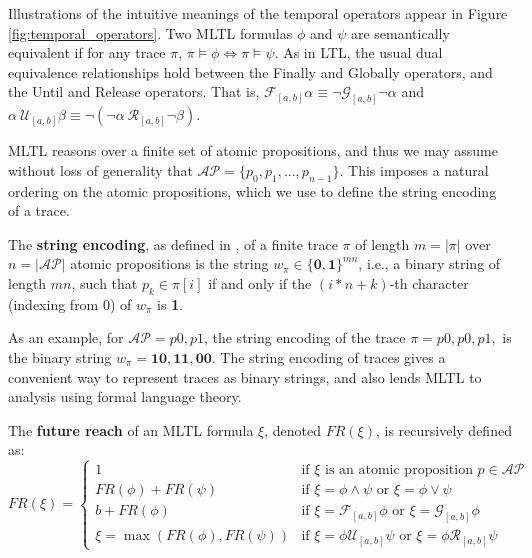\documentclass[letterpaper]{article} %
\begin{document}
Illustrations of the intuitive meanings of the temporal operators appear in Figure \ref{fig:temporal_operators}.
Two MLTL formulas $\phi$ and $\psi$ are semantically equivalent if for any trace $\pi$, $\pi \vDash \phi \iff \pi \vDash \psi$.
As in LTL, the usual dual equivalence relationships hold between the Finally and Globally operators, and the Until and Release operators.
That is, $\mathcal{F}_{[a,b]}\alpha \equiv \neg \mathcal{G}_{[a,b]}\neg \alpha$ and $\alpha \ \mathcal{U}_{[a,b]} \beta \equiv \neg (\neg \alpha \ \mathcal{R}_{[a,b]} \neg \beta)$.

MLTL reasons over a finite set of atomic propositions, and thus we may assume without loss of generality that $\mathcal{AP} = \{p_0, p_1, \ldots, p_{n-1}\}$.
This imposes a natural ordering on the atomic propositions, which we use to define the string encoding of a trace.

    The \textbf{string encoding}, as defined in \cite{WEST_tool}, of a finite trace $\pi$ of length $m = |\pi|$ over $n = |\mathcal{AP}|$ atomic propositions is the string $w_{\pi} \in \{\textbf{0}, \textbf{1}\}^{mn}$, i.e., a binary string of length $mn$, such that $p_k \in \pi[i]$ if and only if 
    the $(i*n + k)$-th character (indexing from 0) %
    of $w_{\pi}$ is \textbf{1}.

As an example, for $\mathcal{AP} = {p0, p1}$, the string encoding of the trace $\pi = {p0}, {p0, p1}, {}$ is the binary string $w_\pi = \textbf{10}, \textbf{11}, \textbf{00}$.
The string encoding of traces gives a convenient way to represent traces as binary strings, and also lends MLTL to analysis using formal language theory. 

    The \textbf{future reach} of an MLTL formula $\xi$, denoted $FR(\xi)$, is recursively defined as:
    $$
    FR(\xi) = 
    \begin{cases}
        1 & \text{if } \xi \text{ is an atomic proposition } p \in \mathcal{AP}\\
        FR(\phi) + FR(\psi) & \text{if } \xi = \phi \land \psi \text{ or } \xi = \phi \lor \psi\\
        b + FR(\phi) & \text{if } \xi = \mathcal{F}_{[a,b]}\phi \text{ or } \xi = \mathcal{G}_{[a,b]}\phi\\
        \xi = \max(FR(\phi), FR(\psi)) & \text{if } \xi = \phi \mathcal{U}_{[a,b]} \psi \text{ or } \xi = \phi \mathcal{R}_{[a,b]} \psi
    \end{cases}
    $$
\end{document}
